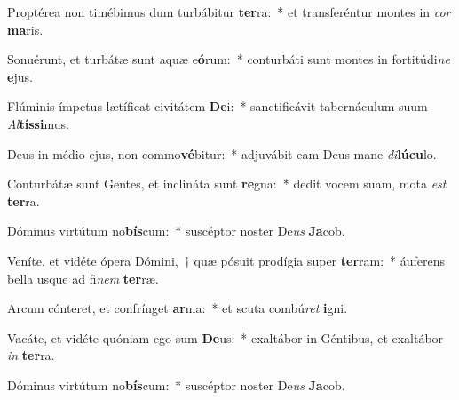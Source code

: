 \item Proptérea non timébimus dum turbábitur \textbf{ter}ra:~* et transferéntur montes in \textit{cor} \textbf{ma}ris.
\item Sonuérunt, et turbátæ sunt aquæ e\textbf{ó}rum:~* conturbáti sunt montes in fortitúdi\textit{ne} \textbf{e}jus.
\item Flúminis ímpetus lætíficat civitátem \textbf{De}i:~* sanctificávit tabernáculum suum \textit{Al}\textbf{tís}\textbf{si}mus.
\item Deus in médio ejus, non commo\textbf{vé}bitur:~* adjuvábit eam Deus mane \textit{di}\textbf{lú}\textbf{cu}lo.
\item Conturbátæ sunt Gentes, et inclináta sunt \textbf{re}gna:~* dedit vocem suam, mota \textit{est} \textbf{ter}ra.
\item Dóminus virtútum no\textbf{bís}cum:~* suscéptor noster De\textit{us} \textbf{Ja}cob.
\item Veníte, et vidéte ópera Dómini,~† quæ pósuit prodígia super \textbf{ter}ram:~* áuferens bella usque ad fi\textit{nem} \textbf{ter}ræ.
\item Arcum cónteret, et confrínget \textbf{ar}ma:~* et scuta combú\textit{ret} \textbf{i}gni.
\item Vacáte, et vidéte quóniam ego sum \textbf{De}us:~* exaltábor in Géntibus, et exaltábor \textit{in} \textbf{ter}ra.
\item Dóminus virtútum no\textbf{bís}cum:~* suscéptor noster De\textit{us} \textbf{Ja}cob.
